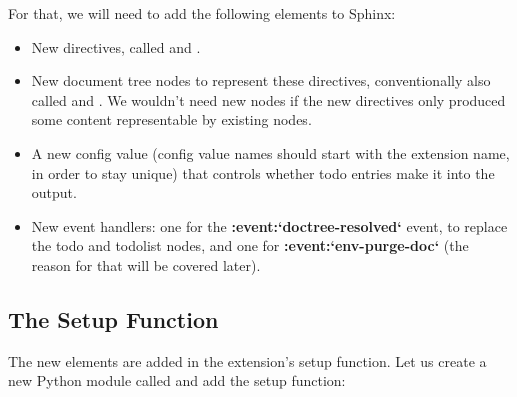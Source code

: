 \documentclass[letterpaper,10pt,english]{sphinxmanual}
\begin{document}
For that, we will need to add the following elements to Sphinx:
\begin{itemize}
\item {} 
New directives, called  and .

\item {} 
New document tree nodes to represent these directives, conventionally also
called  and .  We wouldn't need new nodes if the new
directives only produced some content representable by existing nodes.

\item {} 
A new config value  (config value names should start
with the extension name, in order to stay unique) that controls whether todo
entries make it into the output.

\item {} 
New event handlers: one for the {\color{red}\bfseries{}:event:{}`doctree-resolved{}`} event, to replace
the todo and todolist nodes, and one for {\color{red}\bfseries{}:event:{}`env-purge-doc{}`} (the reason
for that will be covered later).

\end{itemize}


\subsection{The Setup Function}
\label{ext/tutorial:the-setup-function}
The new elements are added in the extension's setup function.  Let us create a
new Python module called  and add the setup function:
\end{document}
